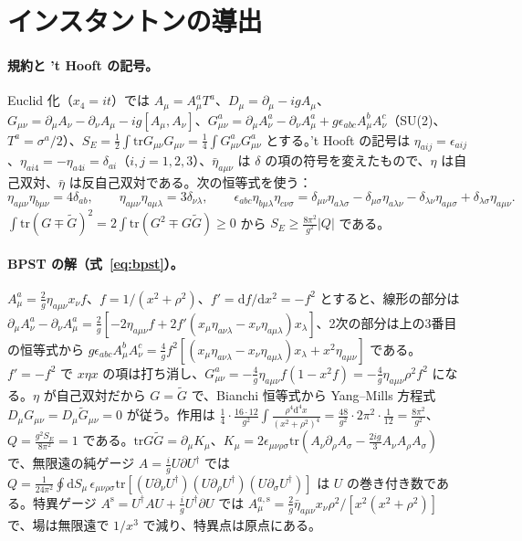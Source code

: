 \documentclass[a4paper,10pt]{ltjsarticle}
\newcommand{\dd}{\mathrm{d}}
\newcommand{\tr}{\mathrm{tr}}
\begin{document}
\section{インスタントンの導出}\label{app:inst}

\paragraph{規約と 't Hooft の記号。}Euclid 化（$x_4=it$）では $A_\mu=A^a_\mu T^a$、$D_\mu=\partial_\mu-igA_\mu$、$G_{\mu\nu}=\partial_\mu A_\nu-\partial_\nu A_\mu-ig[A_\mu,A_\nu]$、$G^a_{\mu\nu}=\partial_\mu A^a_\nu-\partial_\nu A^a_\mu+g\epsilon_{abc}A^b_\mu A^c_\nu$（SU(2)、$T^a=\sigma^a/2$）、$S_E=\frac12\int\tr G_{\mu\nu}G_{\mu\nu}=\frac14\int G^a_{\mu\nu}G^a_{\mu\nu}$ とする。't Hooft の記号は $\eta_{aij}=\epsilon_{aij}$、$\eta_{ai4}=-\eta_{a4i}=\delta_{ai}$（$i,j=1,2,3$）、$\bar\eta_{a\mu\nu}$ は $\delta$ の項の符号を変えたもので、$\eta$ は自己双対、$\bar\eta$ は反自己双対である。次の恒等式を使う：
\begin{equation*}
\eta_{a\mu\nu}\eta_{b\mu\nu}=4\delta_{ab},\qquad \eta_{a\mu\nu}\eta_{a\mu\lambda}=3\delta_{\nu\lambda},\qquad
\epsilon_{abc}\eta_{b\mu\lambda}\eta_{c\nu\sigma}=\delta_{\mu\nu}\eta_{a\lambda\sigma}-\delta_{\mu\sigma}\eta_{a\lambda\nu}-\delta_{\lambda\nu}\eta_{a\mu\sigma}+\delta_{\lambda\sigma}\eta_{a\mu\nu}.
\end{equation*}
$\int\tr(G\mp\tilde G)^2=2\int\tr(G^2\mp G\tilde G)\ge0$ から $S_E\ge\frac{8\pi^2}{g^2}|Q|$ である。

\paragraph{BPST の解（式~\eqref{eq:bpst}）。}$A^a_\mu=\frac2g\eta_{a\mu\nu}x_\nu f$、$f=1/(x^2+\rho^2)$、$f'=\dd f/\dd x^2=-f^2$ とすると、線形の部分は $\partial_\mu A^a_\nu-\partial_\nu A^a_\mu=\frac2g[-2\eta_{a\mu\nu}f+2f'(x_\mu\eta_{a\nu\lambda}-x_\nu\eta_{a\mu\lambda})x_\lambda]$、2次の部分は上の3番目の恒等式から $g\epsilon_{abc}A^b_\mu A^c_\nu=\frac4gf^2[(x_\mu\eta_{a\nu\lambda}-x_\nu\eta_{a\mu\lambda})x_\lambda+x^2\eta_{a\mu\nu}]$ である。$f'=-f^2$ で $x\eta x$ の項は打ち消し、$G^a_{\mu\nu}=-\frac4g\eta_{a\mu\nu}f(1-x^2f)=-\frac4g\eta_{a\mu\nu}\rho^2f^2$ になる。$\eta$ が自己双対だから $G=\tilde G$ で、Bianchi 恒等式から Yang--Mills 方程式 $D_\mu G_{\mu\nu}=D_\mu\tilde G_{\mu\nu}=0$ が従う。作用は $\frac14\cdot\frac{16\cdot12}{g^2}\int\frac{\rho^4\dd^4x}{(x^2+\rho^2)^4}=\frac{48}{g^2}\cdot2\pi^2\cdot\frac1{12}=\frac{8\pi^2}{g^2}$、$Q=\frac{g^2S_E}{8\pi^2}=1$ である。$\tr G\tilde G=\partial_\mu K_\mu$、$K_\mu=2\epsilon_{\mu\nu\rho\sigma}\tr(A_\nu\partial_\rho A_\sigma-\frac{2ig}3A_\nu A_\rho A_\sigma)$ で、無限遠の純ゲージ $A=\frac igU\partial U^\dagger$ では $Q=\frac1{24\pi^2}\oint\dd S_\mu\,\epsilon_{\mu\nu\rho\sigma}\tr[(U\partial_\nu U^\dagger)(U\partial_\rho U^\dagger)(U\partial_\sigma U^\dagger)]$ は $U$ の巻き付き数である。特異ゲージ $A^{\mathrm s}=U^\dagger AU+\frac igU^\dagger\partial U$ では $A^{a,\mathrm s}_\mu=\frac2g\bar\eta_{a\mu\nu}x_\nu\rho^2/[x^2(x^2+\rho^2)]$ で、場は無限遠で $1/x^3$ で減り、特異点は原点にある。
\end{document}
